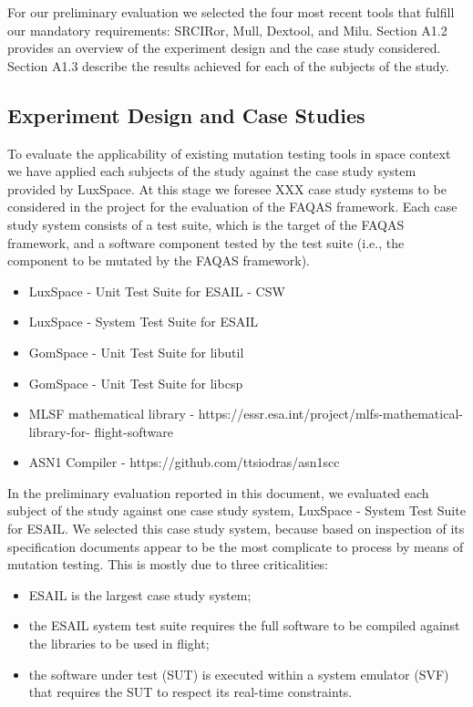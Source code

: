 For our preliminary evaluation we selected the four most recent tools that fulfill our mandatory requirements: SRCIRor, Mull, Dextool, and Milu.
Section A1.2 provides an overview of the experiment design and the case study considered. Section A1.3 describe the results achieved for each of the subjects of the study.

\subsection{Experiment Design and Case Studies}

To evaluate the applicability of existing mutation testing tools in space context we have applied each subjects of the study against the case study system provided by LuxSpace.
At this stage we foresee XXX case study systems to be considered in the project for the evaluation of the FAQAS framework. Each case study system consists of a test suite, which is the target of the FAQAS framework, and a software component tested by the test suite (i.e., the component to be mutated by the FAQAS framework).

\begin{itemize}
	\item LuxSpace - Unit Test Suite for ESAIL - CSW
	\item LuxSpace - System Test Suite for ESAIL
	\item GomSpace - Unit Test Suite for libutil
	\item GomSpace - Unit Test Suite for libcsp
	\item MLSF mathematical library - https://essr.esa.int/project/mlfs-mathematical-library-for-
		flight-software
	\item ASN1 Compiler - https://github.com/ttsiodras/asn1scc
\end{itemize}


In the preliminary evaluation reported in this document, we evaluated each subject of the study against one case study system, LuxSpace - System Test Suite for ESAIL. We selected this case study system, because based on inspection of its specification documents appear to be the most complicate to process by means of mutation testing. This is mostly due to three criticalities:

\begin{itemize}
	\item ESAIL is the largest case study system;
	\item the ESAIL system test suite requires the full software to be compiled against the libraries to be used in flight;
	\item the software under test (SUT) is executed within a system emulator (SVF) that requires the SUT to respect its real-time constraints.
\end{itemize}


